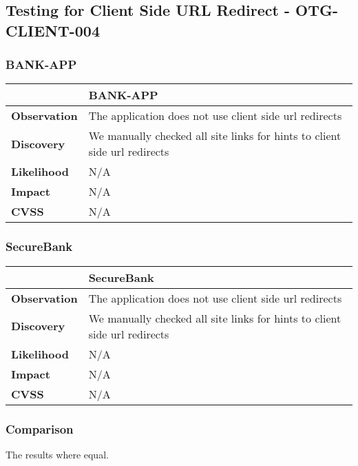 \subsection{Testing for Client Side URL Redirect - OTG-CLIENT-004}
\subsubsection{BANK-APP}
\begin{tabular*}{\textwidth}{ p{} | p{} }\hline
    & \textbf{BANK-APP} \\ \hline
    \textbf{Observation} & 
    	The application does not use client side url redirects
    \\
    \textbf{Discovery} & 
    	We manually checked all site links for hints to client side url redirects
    \\
    \textbf{Likelihood} & 
    	N/A
    \\
    \textbf{Impact} & 
    	N/A
    \\
    \textbf{CVSS} & 
        N/A
    \\
   	\hline
\end{tabular*}

\subsubsection{SecureBank}
\begin{tabular*}{\textwidth}{ p{} | p{} }\hline
    & \textbf{SecureBank} \\ \hline
    \textbf{Observation} & 
    	The application does not use client side url redirects
    \\
    \textbf{Discovery} & 
    	We manually checked all site links for hints to client side url redirects
    \\
    \textbf{Likelihood} & 
    	N/A
    \\
    \textbf{Impact} & 
    	N/A
    \\
    \textbf{CVSS} & 
        N/A
    \\
   	\hline
\end{tabular*}

\subsubsection{Comparison}
The results where equal.
\clearpage